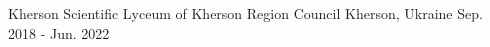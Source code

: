

\begin{cventries}

  \cventry
    {} %
    {\large Kherson Scientific Lyceum of Kherson Region Council} %
    {\large Kherson, Ukraine} %
    {\large Sep. 2018 - Jun. 2022} %
    {
    }

\end{cventries}
